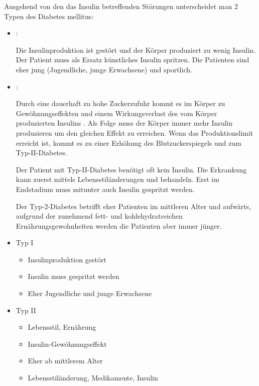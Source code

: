 \begin{Synopsis}
\end{Synopsis}



\clearpage%


{%
Ausgehend von den das Insulin betreffenden Störungen 
unterscheidet man 2 Typen des Diabetes
mellitus:
\begin{itemize}
  \item {}:   
  
  Die Insulinproduktion ist gestört
  und der Körper produziert zu wenig Insulin. Der Patient
  muss als Ersatz künstliches Insulin spritzen.  Die Patienten
  sind eher jung (Jugendliche, junge Erwachsene) und
  sportlich.
  
  
  \item {}:
  
  Durch eine
  dauerhaft zu hohe Zuckerzufuhr kommt es im Körper zu
  Gewöhnungseffekten und einem Wirkungsverlust des vom
  Körper produzierten Insulins . Als
  Folge muss der Körper immer mehr Insulin produzieren um
  den gleichen Effekt zu erreichen. Wenn das
  Produktionslimit erreicht ist, kommt es zu einer Erhöhung
  des Blutzuckerspiegels und zum Typ-II-Diabetes.
  
  Der Patient mit Typ-II-Diabetes benötigt oft kein Insulin.
  Die Erkrankung kann zuerst mittels Lebensstiländerungen
  und  behandeln. Erst im Endstadium muss
  mitunter auch Insulin gespritzt werden.
  
  Der Typ-2-Diabetes betrifft eher Patienten im mittleren
  Alter und aufwärts, aufgrund der zunehmend fett- und
  kohlehydratreichen Ernährungsgewohnheiten werden die
  Patienten aber immer jünger.
\end{itemize}
}{
\begin{itemize}
  \item Typ I
  \begin{itemize}
    \item Insulinproduktion gestört
    \item Insulin muss gespritzt werden
    \item Eher Jugendliche und junge Erwachsene
  \end{itemize}
  \item Typ II
  \begin{itemize}
    \item Lebensstil, Ernährung
    \item Insulin-Gewöhnungseffekt
    \item Eher ab mittlerem Alter
    \item Lebensstiländerung, Medikamente, Insulin
  \end{itemize}
\end{itemize}
}{}{}{}


